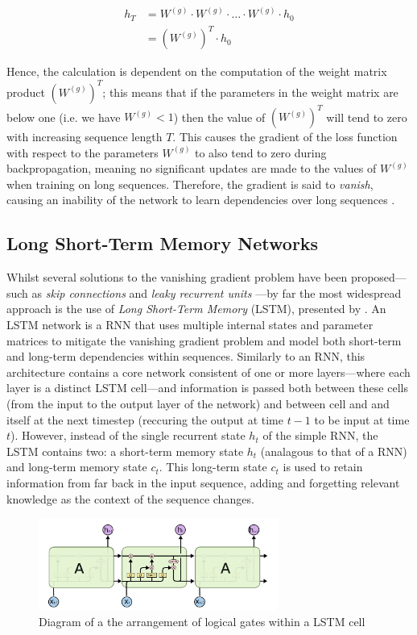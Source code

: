 \documentclass[a4paper, 11pt]{report}
\begin{document}
    \begin{align}
        \label{eq: reccurent-weights}
        h_T &= W^{(g)} \cdot W^{(g)} \cdot \ldots \cdot W^{(g)} \cdot h_0 \\
        &= (W^{(g)})^T \cdot h_0
    \end{align}

    Hence, the calculation is dependent on the computation of the weight matrix product $(W^{(g)})^T$; this means that if the parameters in the weight matrix are below one (i.e. we have $W^{(g)} < 1$) then the value of $(W^{(g)})^T$ will tend to zero with increasing sequence length $T$. This causes the gradient of the loss function with respect to the parameters $W^{(g)}$ to also tend to zero during backpropagation, meaning no significant updates are made to the values of $W^{(g)}$ when training on long sequences. Therefore, the gradient is said to \emph{vanish}, causing an inability of the network to learn dependencies over long sequences \citep{bengio-1994}.


    \subsection{Long Short-Term Memory Networks}

    Whilst several solutions to the vanishing gradient problem have been proposed---such as \emph{skip connections} and \emph{leaky recurrent units} \citep{pascanu-2012}---by far the most widespread approach is the use of \emph{Long Short-Term Memory} (LSTM), presented by \citet{hochreiter-1997}. An LSTM network is a RNN that uses multiple internal states and parameter matrices to mitigate the vanishing gradient problem and model both short-term and long-term dependencies within sequences. Similarly to an RNN, this architecture contains a core network consistent of one or more layers---where each layer is a distinct LSTM cell---and information is passed both between these cells (from the input to the output layer of the network) and between cell and and itself at the next timestep (reccuring the output at time $t-1$ to be input at time $t$). However, instead of the single recurrent state $h_t$ of the simple RNN, the LSTM contains two: a short-term memory state $h_t$ (analagous to that of a RNN) and long-term memory state $c_t$. This long-term state $c_t$ is used to retain information from far back in the input sequence, adding and forgetting relevant knowledge as the context of the sequence changes. 

    \begin{figure}[ht]
        \label{fig: lstm}
        \centering
        \includegraphics[width=0.7\textwidth]{lstm.png}
        \caption{\centering Diagram of a the arrangement of logical gates within a LSTM cell}
    \end{figure}
\end{document}

